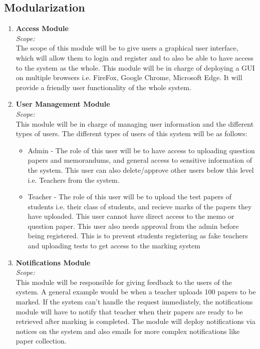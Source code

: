 \documentclass{article}
\begin{document}
	\subsection{Modularization}
		\begin{enumerate}
			\item \textbf{Access Module} \\
							\textit{Scope:}\\
							 The scope of this module will be to give users a graphical user interface, which will allow them to login and register and to also be able to have access to the system as the whole. This module will be in charge of deploying a GUI on multiple browsers i.e. FireFox, Google Chrome, Microsoft Edge. It will provide a friendly user functionality of the whole system.  
						
			\item \textbf{User Management Module}\\
						\textit{Scope:}\\
						This module will be in charge of managing user information and the different types of users. The different types of users of this system will be as follows: \\
						\begin{itemize}
							\item Admin - The role of this user will be to have access to uploading question papers and memorandums, and general access to sensitive information of the system. This user can also delete/approve other users below this level i.e. Teachers from the system. 
							\item Teacher - The role of this user will be to upload the test papers of students i.e. their class of students, and recieve marks of the papers they have uploaded. This user cannot have direct access to the memo or question paper. This user also needs approval from the admin before being registered. This is to prevent students registering as fake teachers and uploading tests to get access to the marking system 
						\end{itemize}
			\item \textbf{Notifications Module}\\
						\textit{Scope:}\\
						This module will be responsible for giving feedback to the users of the system. A general example would be when a teacher uploads 100 papers to be marked. If the system can't handle the request immediately, the notifications module will have to notify that teacher when their papers are ready to be retrieved after marking is completed. The module will deploy notifications via notices on the system and also emails for more complex notifications like paper collection.
					

\end{enumerate}
\end{document}
